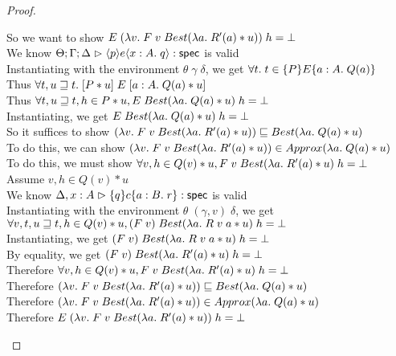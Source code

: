 \begin{proof}
\begin{tabbedproof}
    \ooooooo So we want to show $E\;(\semfun{v}{F\;v\;Best(\semfun{a}{R'(a)*u})})\;h = \bot$ \\
    \ooooooo We know $\judgeS{\mspec{p}{e}{x:A}{q}}$ is valid \\
    \ooooooo Instantiating with the environment $\theta\;\gamma\;\delta$, we get $\forall t.\; t \in \spec{P}{E}{a:A}{Q(a)}$ \\
    \ooooooo Thus $\forall t, u \sqsupseteq t.\; \basicspec{P * u}{E}{a:A}{Q(a) * u}$ \\
    \ooooooo Thus $\forall t, u \sqsupseteq t, h \in P * u, E\;Best(\semfun{a}{Q(a) * u})\;h = \bot$ \\
    \ooooooo Instantiating, we get $E\;Best(\semfun{a}{Q(a) * u})\;h = \bot$ \\
    \ooooooo So it suffices to show $(\semfun{v}{F\;v\;Best(\semfun{a}{R'(a)*u})}) \sqsubseteq 
                                Best(\semfun{a}{Q(a) * u})$ \\
    \ooooooo To do this, we can show $(\semfun{v}{F\;v\;Best(\semfun{a}{R'(a)*u})}) \in Approx(\semfun{a}{Q(a) * u})$ \\
    \ooooooo To do this, we must show $\forall v, h \in Q(v) * u, F\;v\;Best(\semfun{a}{R'(a)*u})\;h = \bot$ \\
    \ooooooo Assume $v, h \in Q(v) * u$ \\
    \oooooooo We know $\judgeS[\Delta,x:A]{\spec{q}{c}{a:B}{r}}$ is valid\\
    \oooooooo Instantiating with the environment $\theta\;(\gamma, v)\;\delta$, we get \\
    \oooooooox $\forall v, t, u \sqsupseteq t, h \in Q(v) * u, (F\;v)\;Best(\semfun{a}{R\;v\;a * u})\;h = \bot$ \\
    \oooooooo Instantiating, we get $(F\;v)\;Best(\semfun{a}{R\;v\;a * u})\;h = \bot$ \\
    \oooooooo By equality, we get $(F\;v)\;Best(\semfun{a}{R'(a) * u})\;h = \bot$ \\
    \ooooooo Therefore $\forall v, h \in Q(v) * u, F\;v\;Best(\semfun{a}{R'(a)*u})\;h = \bot$ \\
    \ooooooo Therefore $(\semfun{v}{F\;v\;Best(\semfun{a}{R'(a)*u})}) \sqsubseteq 
                                Best(\semfun{a}{Q(a) * u})$ \\
    \ooooooo Therefore $(\semfun{v}{F\;v\;Best(\semfun{a}{R'(a)*u})}) \in Approx(\semfun{a}{Q(a) * u})$ \\                        
    \ooooooo Therefore $E\;(\semfun{v}{F\;v\;Best(\semfun{a}{R'(a)*u})})\;h = \bot$ \\

\end{tabbedproof}
\end{proof}
